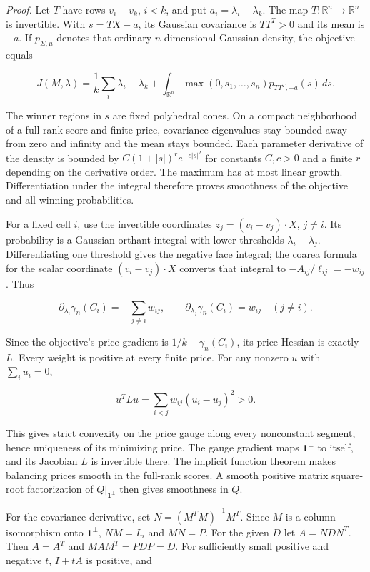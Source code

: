 \documentclass[
  11pt,
]{article}
\begin{document}
\emph{Proof.} Let \(T\) have rows \(v_i-v_k\), \(i<k\), and put
\(a_i=\lambda_i-\lambda_k\). The map \(T:\mathbb R^n\to\mathbb R^n\) is
invertible. With \(s=TX-a\), its Gaussian covariance is \(TT^T>0\) and
its mean is \(-a\). If \(p_{\Sigma,\mu}\) denotes that ordinary
\(n\)-dimensional Gaussian density, the objective equals

\[
 J(M,\lambda)=\frac1k\sum_i\lambda_i-\lambda_k+
 \int_{\mathbb R^n}\max(0,s_1,\ldots,s_n)
                      p_{TT^T,-a}(s)\,ds.                 \tag{8a}
\]

The winner regions in \(s\) are fixed polyhedral cones. On a compact
neighborhood of a full-rank score and finite price, covariance
eigenvalues stay bounded away from zero and infinity and the mean stays
bounded. Each parameter derivative of the density is bounded by
\(C(1+|s|)^r e^{-c|s|^2}\) for constants \(C,c>0\) and a finite \(r\)
depending on the derivative order. The maximum has at most linear
growth. Differentiation under the integral therefore proves smoothness
of the objective and all winning probabilities.

For a fixed cell \(i\), use the invertible coordinates
\(z_j=(v_i-v_j)\cdot X\), \(j\ne i\). Its probability is a Gaussian
orthant integral with lower thresholds \(\lambda_i-\lambda_j\).
Differentiating one threshold gives the negative face integral; the
coarea formula for the scalar coordinate \((v_i-v_j)\cdot X\) converts
that integral to \(-A_{ij}/\ell_{ij}=-w_{ij}\). Thus

\[
 \partial_{\lambda_i}\gamma_n(C_i)=-\sum_{j\ne i}w_{ij},
 \qquad
 \partial_{\lambda_j}\gamma_n(C_i)=w_{ij}\quad(j\ne i).
                                                               \tag{8b}
\]

Since the objective's price gradient is \(1/k-\gamma_n(C_i)\), its price
Hessian is exactly \(L\). Every weight is positive at every finite
price. For any nonzero \(u\) with \(\sum_i u_i=0\),

\[
 u^TLu=\sum_{i<j}w_{ij}(u_i-u_j)^2>0.
\]

This gives strict convexity on the price gauge along every nonconstant
segment, hence uniqueness of its minimizing price. The gauge gradient
maps \(\mathbf1^\perp\) to itself, and its Jacobian \(L\) is invertible
there. The implicit function theorem makes balancing prices smooth in
the full-rank scores. A smooth positive matrix square-root factorization
of \(Q|_{\mathbf1^\perp}\) then gives smoothness in \(Q\).

For the covariance derivative, set \(N=(M^TM)^{-1}M^T\). Since \(M\) is
a column isomorphism onto \(\mathbf1^\perp\), \(NM=I_n\) and \(MN=P\).
For the given \(D\) let \(A=NDN^T\). Then \(A=A^T\) and \(MAM^T=PDP=D\).
For sufficiently small positive and negative \(t\), \(I+tA\) is
positive, and
\end{document}
